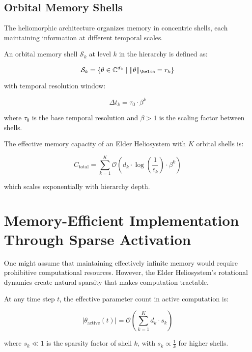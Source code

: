 \subsection{Orbital Memory Shells}

The heliomorphic architecture organizes memory in concentric shells, each maintaining information at different temporal scales.

\begin{definition}
An orbital memory shell $\mathcal{S}_k$ at level $k$ in the hierarchy is defined as:

\begin{equation}
\mathcal{S}_k = \{\theta \in \mathbb{C}^{d_k} \mid \|\theta\|_{\helio} = r_k\}
\end{equation}

with temporal resolution window:

\begin{equation}
\Delta t_k = \tau_0 \cdot \beta^k
\end{equation}

where $\tau_0$ is the base temporal resolution and $\beta > 1$ is the scaling factor between shells.
\end{definition}

\begin{theorem}
The effective memory capacity of an Elder Heliosystem with $K$ orbital shells is:

\begin{equation}
C_{\text{total}} = \sum_{k=1}^K \mathcal{O}(d_k \cdot \log(\frac{1}{\epsilon_k}) \cdot \beta^k)
\end{equation}

which scales exponentially with hierarchy depth.
\end{theorem}


\section{Memory-Efficient Implementation Through Sparse Activation}

One might assume that maintaining effectively infinite memory would require prohibitive computational resources. However, the Elder Heliosystem's rotational dynamics create natural sparsity that makes computation tractable.

\begin{theorem}
At any time step $t$, the effective parameter count in active computation is:

\begin{equation}
|\theta_{\text{active}}(t)| = \mathcal{O}(\sum_{k=1}^K d_k \cdot s_k)
\end{equation}

where $s_k \ll 1$ is the sparsity factor of shell $k$, with $s_k \propto \frac{1}{k}$ for higher shells.
\end{theorem}

